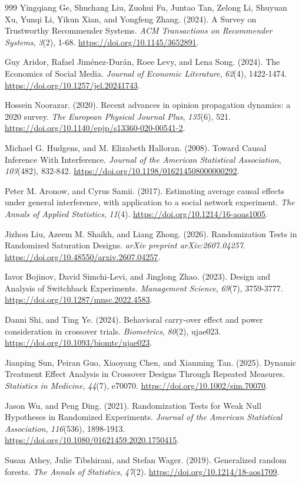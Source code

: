 \documentclass[10pt,a4paper]{article}
\begin{document}
\begin{thebibliography}{999}
Yingqiang Ge, Shuchang Liu, Zuohui Fu, Juntao Tan, Zelong Li, Shuyuan Xu, Yunqi Li, Yikun Xian, and Yongfeng Zhang. (2024). A Survey on Trustworthy Recommender Systems. \textit{ACM Transactions on Recommender Systems}, \textit{3}(2), 1-68. \url{https://doi.org/10.1145/3652891}.

Guy Aridor, Rafael Jim\'{e}nez-Dur\'{a}n, Roee Levy, and Lena Song. (2024). The Economics of Social Media. \textit{Journal of Economic Literature}, \textit{62}(4), 1422-1474. \url{https://doi.org/10.1257/jel.20241743}.

Hossein Noorazar. (2020). Recent advances in opinion propagation dynamics: a 2020 survey. \textit{The European Physical Journal Plus}, \textit{135}(6), 521. \url{https://doi.org/10.1140/epjp/s13360-020-00541-2}.

Michael G. Hudgens, and M. Elizabeth Halloran. (2008). Toward Causal Inference With Interference. \textit{Journal of the American Statistical Association}, \textit{103}(482), 832-842. \url{https://doi.org/10.1198/016214508000000292}.

Peter M. Aronow, and Cyrus Samii. (2017). Estimating average causal effects under general interference, with application to a social network experiment. \textit{The Annals of Applied Statistics}, \textit{11}(4). \url{https://doi.org/10.1214/16-aoas1005}.

Jizhou Liu, Azeem M. Shaikh, and Liang Zhong. (2026). Randomization Tests in Randomized Saturation Designs. \textit{arXiv preprint arXiv:2607.04257}. \url{https://doi.org/10.48550/arxiv.2607.04257}.

Iavor Bojinov, David Simchi-Levi, and Jinglong Zhao. (2023). Design and Analysis of Switchback Experiments. \textit{Management Science}, \textit{69}(7), 3759-3777. \url{https://doi.org/10.1287/mnsc.2022.4583}.

Danni Shi, and Ting Ye. (2024). Behavioral carry-over effect and power consideration in crossover trials. \textit{Biometrics}, \textit{80}(2), ujae023. \url{https://doi.org/10.1093/biomtc/ujae023}.

Jianping Sun, Peiran Guo, Xiaoyang Chen, and Xianming Tan. (2025). Dynamic Treatment Effect Analysis in Crossover Designs Through Repeated Measures. \textit{Statistics in Medicine}, \textit{44}(7), e70070. \url{https://doi.org/10.1002/sim.70070}.

Jason Wu, and Peng Ding. (2021). Randomization Tests for Weak Null Hypotheses in Randomized Experiments. \textit{Journal of the American Statistical Association}, \textit{116}(536), 1898-1913. \url{https://doi.org/10.1080/01621459.2020.1750415}.

Susan Athey, Julie Tibshirani, and Stefan Wager. (2019). Generalized random forests. \textit{The Annals of Statistics}, \textit{47}(2). \url{https://doi.org/10.1214/18-aos1709}.

\end{thebibliography}
\end{document}
